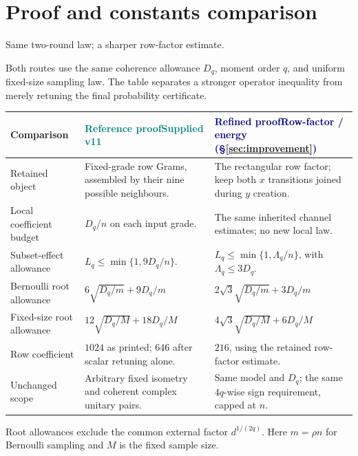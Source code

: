 \documentclass[11pt]{article}
\numberwithin{equation}{section}
\theoremstyle{definition}\newtheorem{definition}[theorem]{Definition}
\theoremstyle{remark}\newtheorem{remark}[theorem]{Remark}
\begin{document}
\section*{Proof and constants comparison}
{\sffamily\color{Teal}\large Same two-round law; a sharper row-factor estimate.\par}
\vspace{2mm}
Both routes use the same coherence allowance $D_q$, moment order $q$, and
uniform fixed-size sampling law. The table separates a stronger operator
inequality from merely retuning the final probability certificate.

\vspace{2mm}
\begingroup
\fontsize{9.5}{11.7}\selectfont
\setlength{\tabcolsep}{4pt}\renewcommand{\arraystretch}{1.16}
\begin{tabularx}{\textwidth}{@{}P{.24\textwidth}YY@{}}
\toprule
\textbf{Comparison} &
\textcolor{Teal}{\textbf{Reference proof}}\newline \textcolor{Teal}{Supplied v11} &
\textcolor{Navy}{\textbf{Refined proof}}\newline \textcolor{Navy}{Row-factor / energy (\S\ref{sec:improvement})}\\
\midrule
{}
Retained object & Fixed-grade row Grams, assembled by their nine possible neighbours. &
The rectangular row factor; keep both $x$ transitions joined during $y$ creation.\\[3pt]
Local coefficient budget & $D_q/n$ on each input grade. & The same inherited channel estimates; no new local law.\\[3pt]
Subset-effect allowance & $L_q\le\min\{1,9D_q/n\}$. &
$L_q\le\min\{1,\Lambda_q/n\}$, with $\Lambda_q\le3D_q$.\\[3pt]
Bernoulli root allowance & $6\sqrt{D_q/m}+9D_q/m$ &
$2\sqrt3\sqrt{D_q/m}+3D_q/m$\\[3pt]
Fixed-size root allowance & $12\sqrt{D_q/M}+18D_q/M$ &
$4\sqrt3\sqrt{D_q/M}+6D_q/M$\\[3pt]
Row coefficient & $1024$ as printed; $646$ after scalar retuning alone. &
$216$, using the retained row-factor estimate.\\[3pt]
Unchanged scope & Arbitrary fixed isometry and coherent complex unitary pairs. &
Same model and $D_q$; the same $4q$-wise sign requirement, capped at $n$.\\[3pt]
\bottomrule
\end{tabularx}
\endgroup
{\footnotesize Root allowances exclude the common external factor $d^{1/(2q)}$.
Here $m=\rho n$ for Bernoulli sampling and $M$ is the fixed sample size.\par}
\end{document}
